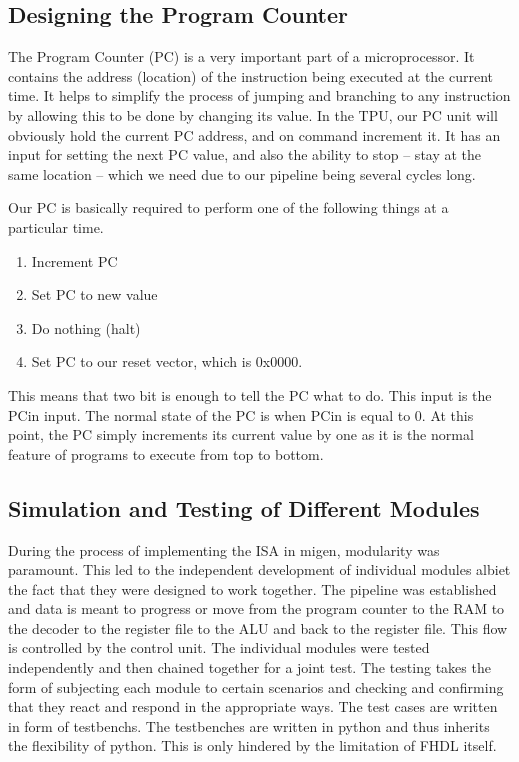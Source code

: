 \subsection{Designing the Program Counter}
The Program Counter (PC) is a very important part of a microprocessor. It contains the address (location) of the instruction being executed at the current time.  It helps to simplify the process of jumping and branching to any instruction by allowing this to be done by changing its value.
In the TPU, our PC unit will obviously hold the current PC address, and on command increment it. It has an input for setting the next PC value, and also the ability to stop – stay at the same location – which we need due to our pipeline being several cycles long.

Our PC is basically required to perform one of the following things at a particular time.
\begin{enumerate}
\item Increment PC
\item Set PC to new value
\item Do nothing (halt)
\item Set PC to our reset vector, which is 0x0000.
\end{enumerate}

This means that two bit is enough to tell the PC what to do. This input is the PCin input. The normal state of the PC is when PCin is equal to 0. At this point, the PC simply increments its current value by one as it is the normal feature of programs to execute from top to bottom.


\subsection{Simulation and Testing of Different Modules}
During the process of implementing the ISA in migen, modularity was paramount. This led to the independent development of individual modules albiet the fact that they were designed to work together. The pipeline was established and data is meant to progress or move from the program counter to the RAM to the decoder to the register file to the ALU and back to the register file. This flow is controlled by the control unit. 
The individual modules were tested independently and then chained together for a joint test. The testing takes the form of subjecting each module to certain scenarios and checking and confirming that they react and respond in the appropriate ways. The test cases are written in form of testbenchs. The testbenches are written in python and thus inherits the flexibility of python. This is only hindered by the limitation of FHDL itself.

